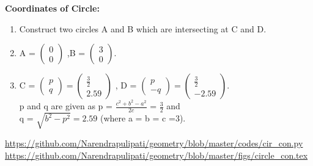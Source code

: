 \begin{frame}
\textbf{Coordinates of Circle:}
\begin{enumerate}
\item Construct two circles A and B which are intersecting at C and D.
\item A = $\begin{pmatrix} 0\\0 \end{pmatrix}$ ,B = $\begin{pmatrix} 3\\0 \end{pmatrix}.$
\item C = $\begin{pmatrix} p\\q \end{pmatrix} = \begin{pmatrix} \frac{3}{2}\\2.59 \end{pmatrix}$ ,
D = $\begin{pmatrix} p\\-q \end{pmatrix} = \begin{pmatrix} \frac{3}{2}\\-2.59 \end{pmatrix}.$\\
p and q are given as p = $\frac{c^2+b^2-a^2}{2c}$ = $\frac{3}{2}$ and\\
 q = $\sqrt{b^2-p^2} = 2.59$ (where a = b = c =3).
\end{enumerate}
\url{https://github.com/Narendrapulipati/geometry/blob/master/codes/cir_con.py}
\url{https://github.com/Narendrapulipati/geometry/blob/master/figs/circle_con.tex}
\end{frame}